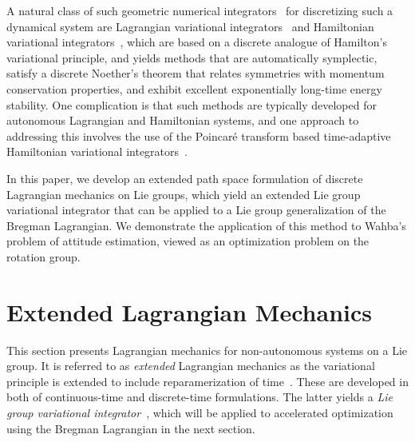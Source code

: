 \documentclass[letterpaper, 10pt, conference]{ieeeconf}
\begin{document}
A natural class of such geometric numerical integrators~\cite{HaLuWa2006} for discretizing such a dynamical system are Lagrangian variational integrators~\cite{MarWesAN01} and Hamiltonian variational integrators~\cite{LeZh2009}, which are based on a discrete analogue of Hamilton's variational principle, and yields methods that are automatically symplectic, satisfy a discrete Noether's theorem that relates symmetries with momentum conservation properties, and exhibit excellent exponentially long-time energy stability.
One complication is that such methods are typically developed for autonomous Lagrangian and Hamiltonian systems, and one approach to addressing this involves the use of the Poincar\'e transform based time-adaptive Hamiltonian variational integrators~\cite{DuScLe2021}.

In this paper, we develop an extended path space formulation of discrete Lagrangian mechanics on Lie groups, which yield an extended Lie group variational integrator that can be applied to a Lie group generalization of the Bregman Lagrangian.
We demonstrate the application of this method to Wahba's problem of attitude estimation, viewed as an optimization problem on the rotation group.

\section{Extended Lagrangian Mechanics}

This section presents Lagrangian mechanics for non-autonomous systems on a Lie group. 
It is referred to as \textit{extended} Lagrangian mechanics as the variational principle is extended to include reparamerization of time~\cite{MarWesAN01}.
These are developed in both of continuous-time and discrete-time formulations. The latter yields a \textit{Lie group variational integrator}~\cite{LeeLeoCMAME07}, which will be applied to accelerated optimization using the Bregman Lagrangian in the next section.
\end{document}
